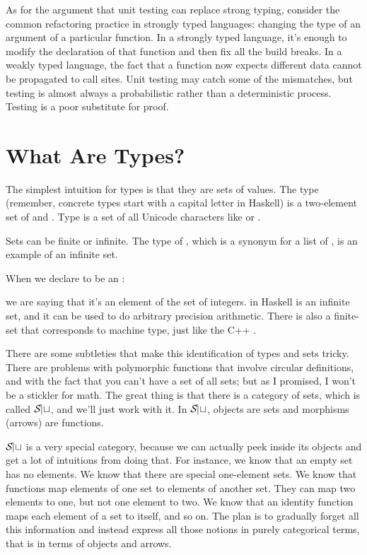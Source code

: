 As for the argument that unit testing can replace strong typing,
consider the common refactoring practice in strongly typed languages:
changing the type of an argument of a particular function. In a strongly
typed language, it's enough to modify the declaration of that function
and then fix all the build breaks. In a weakly typed language, the fact
that a function now expects different data cannot be propagated to call
sites. Unit testing may catch some of the mismatches, but testing is
almost always a probabilistic rather than a deterministic process.
Testing is a poor substitute for proof.

\section{What Are Types?}

The simplest intuition for types is that they are sets of values. The
type  (remember, concrete types start with a capital letter
in Haskell) is a two-element set of  and .
Type  is a set of all Unicode characters like
 or .

Sets can be finite or infinite. The type of , which is a
synonym for a list of , is an example of an infinite set.

When we declare  to be an :

we are saying that it's an element of the set of integers.
 in Haskell is an infinite set, and it can be used to do
arbitrary precision arithmetic. There is also a finite-set 
that corresponds to machine type, just like the C++ .

There are some subtleties that make this identification of types and
sets tricky. There are problems with polymorphic functions that involve
circular definitions, and with the fact that you can't have a set of all
sets; but as I promised, I won't be a stickler for math. The great thing
is that there is a category of sets, which is called $\mathcal{S\mkern-3mu et}$, and
we'll just work with it. In $\mathcal{S\mkern-3mu et}$, objects are sets and morphisms
(arrows) are functions.

$\mathcal{S\mkern-3mu et}$ is a very special category, because we can actually peek
inside its objects and get a lot of intuitions from doing that. For
instance, we know that an empty set has no elements. We know that there
are special one-element sets. We know that functions map elements of one
set to elements of another set. They can map two elements to one, but
not one element to two. We know that an identity function maps each
element of a set to itself, and so on. The plan is to gradually forget
all this information and instead express all those notions in purely
categorical terms, that is in terms of objects and arrows.

